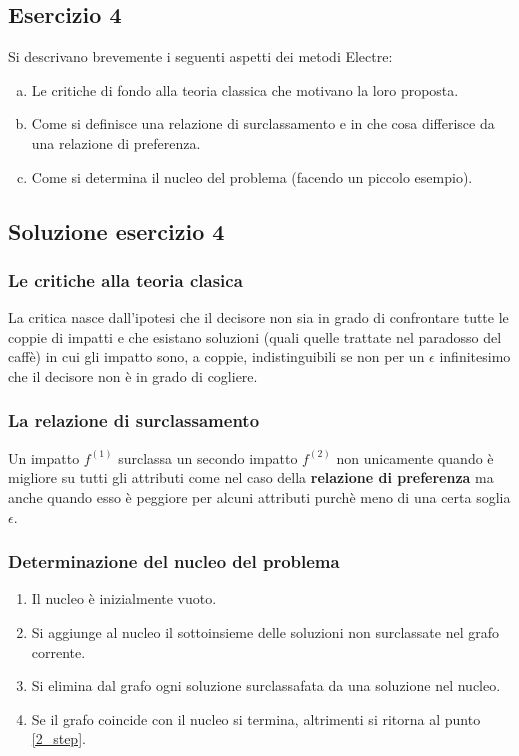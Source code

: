\documentclass[\main/main.tex]{subfiles}
\begin{document}
\subsection{Esercizio 4}
Si descrivano brevemente i seguenti aspetti dei metodi Electre:

\begin{enumerate}[a)]
  \item Le critiche di fondo alla teoria classica che motivano la loro proposta.
  \item Come si definisce una relazione di surclassamento e in che cosa differisce da una relazione di preferenza.
  \item Come si determina il nucleo del problema (facendo un piccolo esempio).
\end{enumerate}

\subsection{Soluzione esercizio 4}
\subsubsection*{Le critiche alla teoria clasica}
La critica nasce dall'ipotesi che il decisore non sia in grado di confrontare tutte le coppie di impatti e che esistano soluzioni (quali quelle trattate nel paradosso del caffè) in cui gli impatto sono, a coppie, indistinguibili se non per un $\epsilon$ infinitesimo che il decisore non è in grado di cogliere.

\subsubsection*{La relazione di surclassamento}
Un impatto $f^{(1)}$ surclassa un secondo impatto $f^{(2)}$ non unicamente quando è migliore su tutti gli attributi come nel caso della \textbf{relazione di preferenza} ma anche quando esso è peggiore per alcuni attributi purchè meno di una certa soglia $\epsilon$.

\subsubsection*{Determinazione del nucleo del problema}
\begin{enumerate}
  \item Il nucleo è inizialmente vuoto.
  \item Si aggiunge al nucleo il sottoinsieme delle soluzioni non surclassate nel grafo corrente. \label{2_step}
  \item Si elimina dal grafo ogni soluzione surclassafata da una soluzione nel nucleo.
  \item Se il grafo coincide con il nucleo si termina, altrimenti si ritorna al punto \ref{2_step}.
\end{enumerate}
\end{document}
